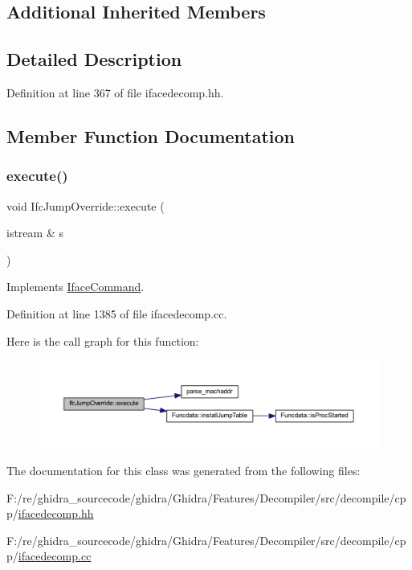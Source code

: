 \subsection*{Additional Inherited Members}


\subsection{Detailed Description}


Definition at line 367 of file ifacedecomp.\+hh.



\subsection{Member Function Documentation}
\mbox{\label{class_ifc_jump_override_a90f8e712da03bb3c716692501627f890}} 
\subsubsection{\texorpdfstring{execute()}{execute()}}
{\footnotesize\ttfamily void Ifc\+Jump\+Override\+::execute (\begin{DoxyParamCaption}\item[{istream \&}]{s }\end{DoxyParamCaption})\hspace{0.3cm}{\ttfamily [virtual]}}



Implements \mbox{\hyperlink{class_iface_command_af10e29cee2c8e419de6efe9e680ad201}{Iface\+Command}}.



Definition at line 1385 of file ifacedecomp.\+cc.

Here is the call graph for this function\+:
\nopagebreak
\begin{figure}[H]
\begin{center}
\leavevmode
\includegraphics[width=350pt]{class_ifc_jump_override_a90f8e712da03bb3c716692501627f890_cgraph}
\end{center}
\end{figure}


The documentation for this class was generated from the following files\+:\begin{DoxyCompactItemize}
\item 
F\+:/re/ghidra\+\_\+sourcecode/ghidra/\+Ghidra/\+Features/\+Decompiler/src/decompile/cpp/\mbox{\hyperlink{ifacedecomp_8hh}{ifacedecomp.\+hh}}\item 
F\+:/re/ghidra\+\_\+sourcecode/ghidra/\+Ghidra/\+Features/\+Decompiler/src/decompile/cpp/\mbox{\hyperlink{ifacedecomp_8cc}{ifacedecomp.\+cc}}\end{DoxyCompactItemize}
